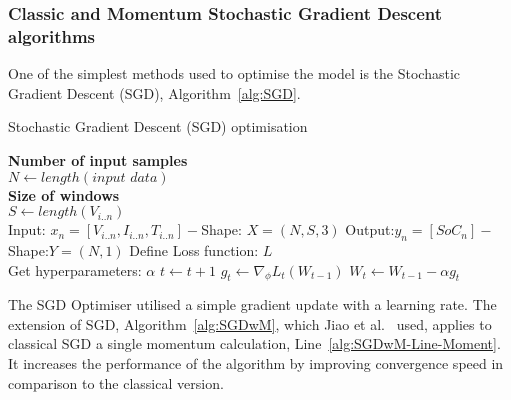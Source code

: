 %
\subsubsection{Classic and Momentum Stochastic Gradient Descent algorithms}
One of the simplest methods used to optimise the model is the Stochastic Gradient Descent (SGD), \mbox{Algorithm~\ref{alg:SGD}}.
\begin{algorithm}
  \caption{Stochastic Gradient Descent (SGD) optimisation}
  \begin{algorithmic}[1]
    \STATE \textbf{Number of input samples} \\ $N\gets length(\textit{input data})$\\
    \STATE \textbf{Size of windows} \\ $S\gets length(V_{i..n})$\\
    \STATE Input: $x_n = [V_{i..n}, I_{i..n}, T_{i..n}] - $Shape: $X = (N, S, 3)$
    \STATE Output:$y_n = [SoC_{n}] - $Shape:$Y = (N, 1)$
    \STATE Define Loss function: $L$ \\
           Get hyperparameters: $\alpha$
    \STATE $t \gets t+1$
    \STATE $g_t \gets \nabla_\phi L_t (W_{t-1})$ 
    \STATE $W_t \gets W_{t-1} - \alpha g_t $ 
    \ENDWHILE
  \end{algorithmic}
  \label{alg:SGD}
\end{algorithm}
The SGD Optimiser utilised a simple gradient update with a learning rate.
The extension of SGD, Algorithm~\ref{alg:SGDwM}, which Jiao et al.~\cite{jiao_gru-rnn_2020} used, applies to classical SGD a single momentum calculation, Line~\ref{alg:SGDwM-Line-Moment}.
It increases the performance of the algorithm by improving convergence speed in comparison to the classical version.
